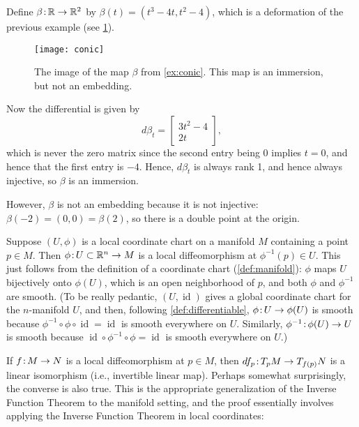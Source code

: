 \begin{example}\label{ex:conic}
	Define $\beta \colon\thinspace\!\! \mathbb{R} \to \mathbb{R}^2$ by $\beta(t) = (t^3 - 4t, t^2 - 4)$, which is a deformation of the previous example (see \cref{fig:conic}).
	
	\begin{figure}[htbp]
		\centering
			\texttt{[image: conic]}
		\caption{The image of the map $\beta$ from \cref{ex:conic}. This map is an immersion, but not an embedding.}
		\label{fig:conic}
	\end{figure}
	
	Now the differential is given by
	\[
		d\beta_t = \begin{bmatrix} 3t^2 - 4 \\ 2t \end{bmatrix},
	\]
	which is never the zero matrix since the second entry being 0 implies $t=0$, and hence that the first entry is $-4$. Hence, $d\beta_t$ is always rank 1, and hence always injective, so $\beta$ is an immersion.
	
	However, $\beta$ is not an embedding because it is not injective: $\beta(-2) = (0,0) = \beta(2)$, so there is a double point at the origin.
\end{example}

\begin{example}\label{ex:coordinate charts are local diffeomorphisms}
	Suppose $(U,\phi)$ is a local coordinate chart on a manifold $M$ containing a point $p \in M$. Then $\phi \colon\thinspace\!\! U \subset \mathbb{R}^n \to M$ is a local diffeomorphism at $\phi^{-1}(p) \in U$. This just follows from the definition of a coordinate chart (\cref{def:manifold}): $\phi$ maps $U$ bijectively onto $\phi(U)$, which is an open neighborhood of $p$, and both $\phi$ and $\phi^{-1}$ are smooth. (To be really pedantic, $(U, \operatorname{id})$ gives a global coordinate chart for the $n$-manifold $U$, and then, following \cref{def:differentiable}, $\phi \colon\thinspace\!\! U \to \phi(U)$ is smooth because $\phi^{-1} \circ \phi \circ \operatorname{id} = \operatorname{id}$ is smooth everywhere on $U$. Similarly, $\phi^{-1} \colon\thinspace\!\! \phi(U) \to U$ is smooth because $\operatorname{id} \circ \phi^{-1} \circ \phi = \operatorname{id}$ is smooth everywhere on $U$.)
\end{example}

If $f \colon\thinspace\!\! M \to N$ is a local diffeomorphism at $p \in M$, then $df_p \colon\thinspace\!\! T_pM \to T_{f(p)}N$ is a linear isomorphism (i.e., invertible linear map). Perhaps somewhat surprisingly, the converse is also true. This is the appropriate generalization of the Inverse Function Theorem to the manifold setting, and the proof essentially involves applying the Inverse Function Theorem in local coordinates:

